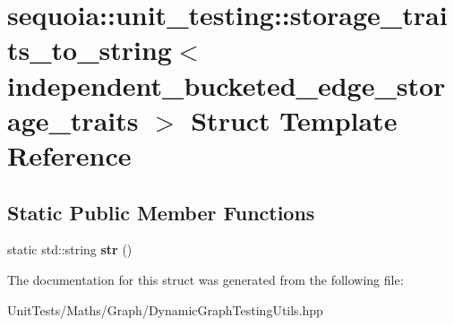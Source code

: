 \hypertarget{structsequoia_1_1unit__testing_1_1storage__traits__to__string_3_01independent__bucketed__edge__storage__traits_01_4}{}\section{sequoia\+::unit\+\_\+testing\+::storage\+\_\+traits\+\_\+to\+\_\+string$<$ independent\+\_\+bucketed\+\_\+edge\+\_\+storage\+\_\+traits $>$ Struct Template Reference}
\label{structsequoia_1_1unit__testing_1_1storage__traits__to__string_3_01independent__bucketed__edge__storage__traits_01_4}
\subsection*{Static Public Member Functions}
\begin{DoxyCompactItemize}
\item 
\mbox{\label{structsequoia_1_1unit__testing_1_1storage__traits__to__string_3_01independent__bucketed__edge__storage__traits_01_4_ad8f662a3c27aea3aa6a8ec13589867c1}} 
static std\+::string {\bfseries str} ()
\end{DoxyCompactItemize}


The documentation for this struct was generated from the following file\+:\begin{DoxyCompactItemize}
\item 
Unit\+Tests/\+Maths/\+Graph/Dynamic\+Graph\+Testing\+Utils.\+hpp\end{DoxyCompactItemize}
